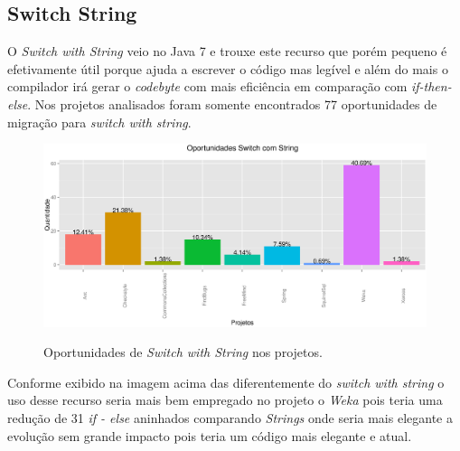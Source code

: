 \subsection{Switch String}

O \textit{Switch with String} veio no Java 7 e trouxe este recurso que porém pequeno é efetivamente útil porque ajuda a escrever o código mas legível e além do mais o compilador 
irá gerar o \textit{codebyte} com mais eficiência em comparação com \textit{if-then-else}. Nos projetos analisados foram somente encontrados 77 oportunidades de migração para \textit{switch with string}.

\begin{figure}[h]
	\center
	\includegraphics[scale=0.5]{Imagens/oportunidadesSwitchString}
	\label{fig:Switch with String}
	\caption{Oportunidades de \textit{Switch with String} nos projetos.}
\end{figure}

Conforme exibido na imagem acima das diferentemente do \textit{switch with string} o uso desse recurso seria mais bem empregado no projeto o \textit{Weka} pois teria uma redução de 31 \textit{if - else} aninhados comparando \textit{Strings} onde seria mais elegante a evolução sem grande impacto pois teria um código mais elegante e atual.
